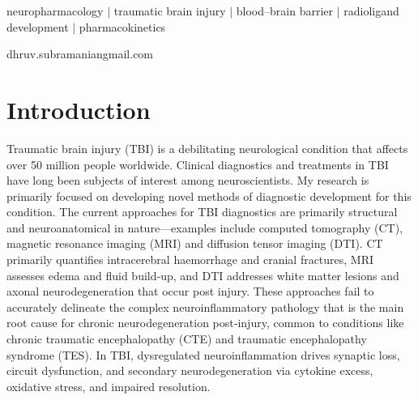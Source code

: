 \documentclass[times, twoside]{zHenriquesLab-StyleBioRxiv}
\begin{document}
		\begin{keywords}
			
			neuropharmacology $\mid$ traumatic brain injury $\mid$ blood–brain barrier $\mid$ radioligand development $\mid$ pharmacokinetics
		\end{keywords}
		
		\begin{corrauthor}
			dhruv.subramanian\at gmail.com
		\end{corrauthor}
		
		\section*{Introduction}
		Traumatic brain injury (TBI) is a debilitating neurological condition that affects over 50 million people worldwide.  Clinical diagnostics and treatments in TBI have long been subjects of interest among neuroscientists.  My research is primarily focused on developing novel methods of diagnostic development for this condition.  The current approaches for TBI diagnostics are primarily structural and neuroanatomical in nature—examples include computed tomography (CT), magnetic resonance imaging (MRI) and diffusion tensor imaging (DTI).  CT primarily quantifies intracerebral haemorrhage and cranial fractures, MRI assesses edema and fluid build‑up, and DTI addresses white matter lesions and axonal neurodegeneration that occur post injury.  These approaches fail to accurately delineate the complex neuroinflammatory pathology that is the main root cause for chronic neurodegeneration post‑injury, common to conditions like chronic traumatic encephalopathy (CTE) and traumatic encephalopathy syndrome (TES).  In TBI, dysregulated neuroinflammation drives synaptic loss, circuit dysfunction, and secondary neurodegeneration via cytokine excess, oxidative stress, and impaired resolution.
		
\end{document}
